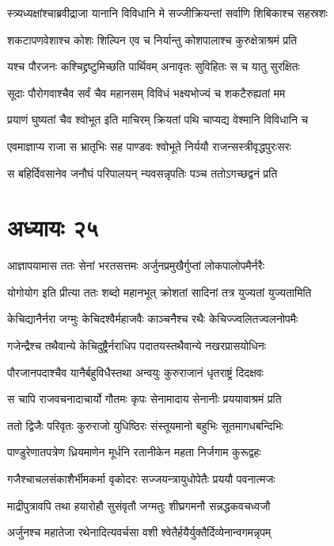 \twolineshloka
{स्त्र्यध्यक्षांश्चाब्रवीद्राजा यानानि विविधानि मे}
{सज्जीक्रियन्तां सर्वाणि शिबिकाश्च सहस्रशः}


\twolineshloka
{शकटापणवेशाश्च कोशः शिल्पिन एव च}
{निर्यान्तु कोशपालाश्च कुरुक्षेत्राश्रमं प्रति}


\twolineshloka
{यश्च पौरजनः कश्चिद्द्रष्टुमिच्छति पार्थिवम्}
{अनावृतः सुविहितः स च यातु सुरक्षितः}


\twolineshloka
{सूदाः पौरोगवाश्चैव सर्वं चैव महानसम्}
{विविधं भक्ष्यभोज्यं च शकटैरुह्यतां मम}


\threelineshloka
{प्रयाणं घुष्यतां चैव श्वोभूत इति माचिरम्}
{क्रियतां पथि चाप्यद्य वेश्मानि विविधानि च}
{}


\twolineshloka
{एवमाज्ञाप्य राजा स भ्रातृभिः सह पाण्डवः}
{श्वोभूते निर्ययौ राजन्सस्त्रीवृद्धपुरःसरः}


\twolineshloka
{स बहिर्दिवसानेव जनौघं परिपालयन्}
{न्यवसन्नृपतिः पञ्च ततोऽगच्छद्वनं प्रति}


\chapter{अध्यायः २५}
\twolineshloka
{आज्ञापयामास ततः सेनां भरतसत्तमः}
{अर्जुनप्रमुखैर्गुप्तां लोकपालोपमैर्नरैः}


\twolineshloka
{योगोयोग इति प्रीत्या ततः शब्दो महानभूत्}
{क्रोशतां सादिनां तत्र युज्यतां युज्यतामिति}


\twolineshloka
{केचिद्यानैर्नरा जग्मुः केचिदश्वैर्महाजवैः}
{काञ्चनैश्च रथैः केचिज्ज्वलितज्वलनोपमैः}


\twolineshloka
{गजेन्द्रैश्च तथैवान्ये केचिदुष्ट्रैर्नराधिप}
{पदातयस्तथैवान्ये नखरप्रासयोधिनः}


\twolineshloka
{पौरजानपदाश्चैव यानैर्बहुविधैस्तथा}
{अन्वयुः कुरुराजानं धृतराष्ट्रं दिदक्षवः}


\twolineshloka
{स चापि राजवचनादाचार्यो गौतमः कृपः}
{सेनामादाय सेनानीः प्रययावाश्रमं प्रति}


\twolineshloka
{ततो द्विजैः परिवृतः कुरुराजो युधिष्ठिरः}
{संस्तूयमानो बहुभिः सूतमागधबन्दिभिः}


\twolineshloka
{पाण्डुरेणातपत्रेण ध्रियमाणेन मूर्धनि}
{रतानीकेन महता निर्जगाम कुरूद्वहः}


\twolineshloka
{गजैश्चाचलसंकाशैर्भीमकर्मा वृकोदरः}
{सज्जयन्त्रायुधोपेतैः प्रययौ पवनात्मजः}


\twolineshloka
{माद्रीपुत्रावपि तथा हयारोहौ सुसंवृतौ}
{जग्मतुः शीघ्रगमनौ सन्नद्धकवचध्वजौ}


\twolineshloka
{अर्जुनश्च महातेजा रथेनादित्यवर्चसा}
{वशी श्वेतैर्हयैर्युक्तैर्दिव्येनान्वगमन्नृपम्}


